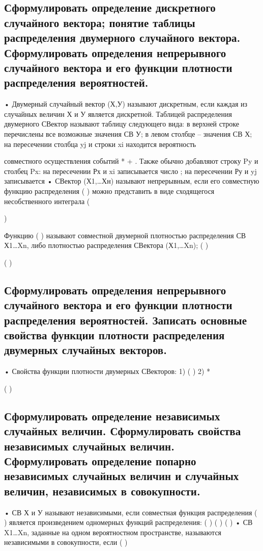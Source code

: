 \subsection{Сформулировать определение дискретного случайного вектора; понятие таблицы распределения двумерного случайного вектора. Сформулировать определения непрерывного случайного вектора и его функции плотности распределения вероятностей.}

• Двумерный случайный вектор (Х,У) называют дискретным, если каждая из случайных величин Х и У является дискретной.
Таблицей распределения двумерного СВектор называют таблицу следующего вида:
в верхней строке перечислены все возможные значения
СВ У; в левом столбце – значения
СВ Х;
на пересечении столбца yj и строки xi находится вероятность {
	
} совместного осуществления событий *
+ {
}.
Также обычно добавляют строку Py и столбец Px:
на пересечении Рх и xi записывается число ; на пересечении Ру и yj записывается
• СВектор (Х1,…Хн) называют непрерывным, если его совместную функцию распределения
(
) можно представить в виде
сходящегося несобственного интеграла (

)





Функцию (
) называют совместной двумерной плотностью распределения СВ Х1…Xn, либо плотностью распределения СВектора
(Х1,…Xn); (
)

( )



\subsection{Сформулировать определения непрерывного случайного вектора и его функции плотности распределения вероятностей. Записать основные свойства функции плотности распределения двумерных случайных векторов.}

• Свойства функции плотности двумерных СВекторов:
1) ( )
2) *

( ) 

\subsection{Сформулировать определение независимых случайных величин. Сформулировать свойства независимых случайных величин. Сформулировать определение попарно независимых случайных величин и случайных величин, независимых в совокупности.}

• СВ Х и У называют независимыми, если совместная функция распределения ( ) является произведением одномерных функций
распределения: ( )
( )
( )
• СВ X1…Xn, заданные на одном вероятностном пространстве, называются независимыми в совокупности, если
(
)



